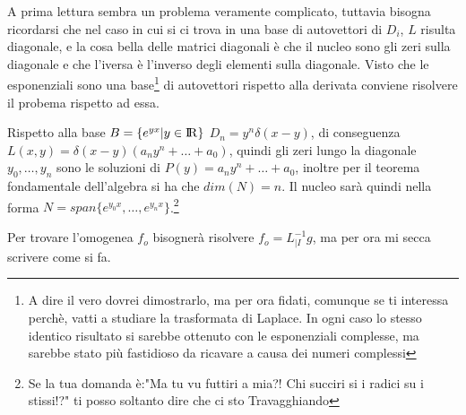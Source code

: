 \documentclass[11pt,a4paper]{article}
\theoremstyle{definition}
\theoremstyle{plain}
\theoremstyle{plain}
\begin{document}
		A prima lettura sembra un problema veramente complicato, tuttavia bisogna ricordarsi che nel caso in cui si ci trova in una base di autovettori di $D_i$, $L$ risulta diagonale, e la cosa bella delle matrici diagonali è che il nucleo sono gli zeri sulla diagonale e che l'iversa è l'inverso degli elementi sulla diagonale.\newline
		Visto che le esponenziali sono una base\footnote{A dire il vero dovrei dimostrarlo, ma per ora fidati, comunque se ti interessa perchè, vatti a studiare la trasformata di Laplace. In ogni caso lo stesso identico risultato si sarebbe ottenuto con le esponenziali complesse, ma sarebbe stato più fastidioso da ricavare a causa dei numeri complessi} di autovettori rispetto alla derivata conviene risolvere il probema rispetto ad essa.\newline

		Rispetto alla base $B=\{e^{yx}|y \in \rm I\!R\}$ $D_n=y^n\delta(x-y)$, di conseguenza $L(x,y)=\delta(x-y)(a_ny^n+\dots+a_0)$, quindi gli zeri lungo la diagonale $y_0,\dots,y_n$ sono le soluzioni di $P(y)=a_ny^n+\dots+a_0$, inoltre per il teorema fondamentale dell'algebra si ha che $dim(N)=n$. Il nucleo sarà quindi nella forma $N=span\{e^{y_0x},\dots,e^{y_nx}\}$.\footnote{Se la tua domanda è:"Ma tu vu futtiri a mia?! Chi succiri si i radici su i stissi!?" ti posso soltanto dire che ci sto Travagghiando}\newline

		Per trovare l'omogenea $f_o$ bisognerà risolvere $f_o=L^{-1}_{|I}g$, ma per ora mi secca scrivere come si fa.
\end{document}
